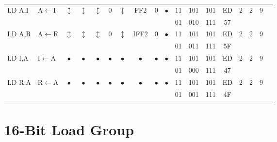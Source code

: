 \documentclass[oneside,a4paper]{book}
\begin{document}
{\begin{tabular}{llcccccccccccccccl}
		LD A,I\instrt & 
			A$\leftarrow$I & 
			$\updownarrow$ & 
				$\updownarrow$ &
				 $\updownarrow$ & 
				 0 & 
				 $\updownarrow$ & 
				 {\tiny FF2} & 
				 0 & 
				 $\bullet$ & 
			11 & 101 & 101 & 
			ED & 2 & 
			2 & 9 & \\ 
		\multicolumn{10}{c}{} & 01 & 010 & 111 & 57 & & & & \instrb \\

		LD A,R\instrt & 
			A$\leftarrow$R & 
			$\updownarrow$ & 
				$\updownarrow$ & 
				$\updownarrow$ & 
				0 & 
				$\updownarrow$ & 
				{\tiny IFF2} & 
				0 & 
				$\bullet$ & 
			11 & 101 & 101 & 
			ED & 2 & 
			2 & 9 & \\ 
		\multicolumn{10}{c}{} & 01 & 011 & 111 & 5F & & & & \instrb \\

		LD I,A\instrt & 
			I$\leftarrow$A & 
			$\bullet$ & 
				$\bullet$ & 
				$\bullet$ & 
				$\bullet$ & 
				$\bullet$ & 
				$\bullet$ & 
				$\bullet$ & 
				$\bullet$ & 
			11 & 101 & 101 & 
			ED & 2 & 
			2 & 9 & \\ 
		\multicolumn{10}{c}{} & 01 & 000 & 111 & 47 & & & & \instrb \\

		LD R,A\instrt & 
			R$\leftarrow$A & 
			$\bullet$ & 
				$\bullet$ & 
				$\bullet$ & 
				$\bullet$ & 
				$\bullet$ & 
				$\bullet$ & 
				$\bullet$ & 
				$\bullet$ & 
			11 & 101 & 101 & 
			ED & 2 & 
			2 & 9 & \\ 
		\multicolumn{10}{c}{} & 01 & 001 & 111 & 4F & & & & \instrb \\

	\hline

	\end{tabular}
}


\section{16-Bit Load Group}
\end{document}
